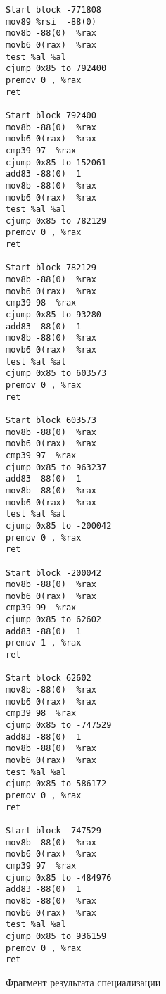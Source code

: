 \documentclass{spbau-diploma}
\begin{document}
\begin{figure}
\begin{multicols}{2}
\begin{lstlisting}
Start block -771808
mov89 %rsi  -88(0) 
mov8b -88(0)  %rax 
movb6 0(rax)  %rax 
test %al %al
cjump 0x85 to 792400
premov 0 , %rax 
ret

Start block 792400
mov8b -88(0)  %rax 
movb6 0(rax)  %rax 
cmp39 97  %rax 
cjump 0x85 to 152061
add83 -88(0)  1
mov8b -88(0)  %rax 
movb6 0(rax)  %rax 
test %al %al
cjump 0x85 to 782129
premov 0 , %rax 
ret

Start block 782129
mov8b -88(0)  %rax 
movb6 0(rax)  %rax 
cmp39 98  %rax 
cjump 0x85 to 93280
add83 -88(0)  1
mov8b -88(0)  %rax 
movb6 0(rax)  %rax 
test %al %al
cjump 0x85 to 603573
premov 0 , %rax 
ret

Start block 603573
mov8b -88(0)  %rax 
movb6 0(rax)  %rax 
cmp39 97  %rax 
cjump 0x85 to 963237
add83 -88(0)  1
mov8b -88(0)  %rax 
movb6 0(rax)  %rax 
test %al %al
cjump 0x85 to -200042
premov 0 , %rax 
ret

Start block -200042
mov8b -88(0)  %rax 
movb6 0(rax)  %rax 
cmp39 99  %rax 
cjump 0x85 to 62602
add83 -88(0)  1
premov 1 , %rax 
ret

Start block 62602
mov8b -88(0)  %rax 
movb6 0(rax)  %rax 
cmp39 98  %rax 
cjump 0x85 to -747529
add83 -88(0)  1
mov8b -88(0)  %rax 
movb6 0(rax)  %rax 
test %al %al
cjump 0x85 to 586172
premov 0 , %rax 
ret

Start block -747529
mov8b -88(0)  %rax 
movb6 0(rax)  %rax 
cmp39 97  %rax 
cjump 0x85 to -484976
add83 -88(0)  1
mov8b -88(0)  %rax 
movb6 0(rax)  %rax 
test %al %al
cjump 0x85 to 936159
premov 0 , %rax 
ret
\end{lstlisting}
\end{multicols}
\caption{ Фрагмент результата специализации}
\label{fig:speckmp}
\end{figure}
\end{document}
